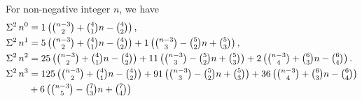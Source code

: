 \begin{example} For non-negative integer $n$, we have
  \begin{align*}
    \Sigma^{2}\,{n}^{0}
    &= 1 \left( \tbinom{n-3}{2} + \tbinom{4}{1} n - \tbinom{4}{2} \right),
    \\
    \Sigma^{2}\,{n}^{1}
    &= 5 \left( \tbinom{n-3}{2} + \tbinom{4}{1} n - \tbinom{4}{2} \right)
    + 1 \left( \tbinom{n-3}{3} - \tbinom{5}{2} n + \tbinom{5}{3} \right),
    \\
    \Sigma^{2}\,{n}^{2}
    &= 25 \left( \tbinom{n-3}{2} + \tbinom{4}{1} n - \tbinom{4}{2} \right)
    + 11 \left( \tbinom{n-3}{3} - \tbinom{5}{2} n + \tbinom{5}{3} \right)
    + 2 \left( \tbinom{n-3}{4} + \tbinom{6}{3} n - \tbinom{6}{4} \right).
    \\
    \Sigma^{2}\,{n}^{3}
    &=
    125 \left( \tbinom{n-3}{2} + \tbinom{4}{1} n - \tbinom{4}{2} \right)
    + 91 \left( \tbinom{n-3}{3} - \tbinom{5}{2} n + \tbinom{5}{3} \right)
    + 36 \left( \tbinom{n-3}{4} + \tbinom{6}{3} n - \tbinom{6}{4} \right) \\
    &+ 6 \left( \tbinom{n-3}{5} - \tbinom{7}{3} n + \tbinom{7}{4} \right)
  \end{align*}
\end{example}
